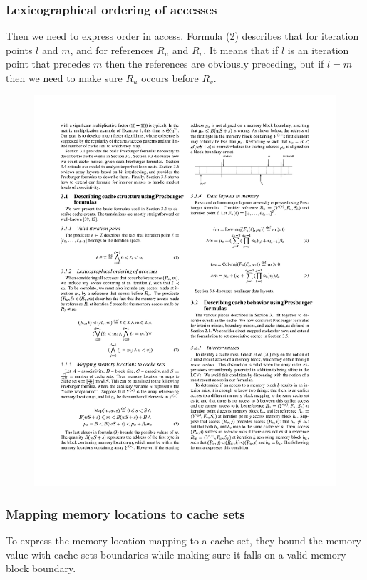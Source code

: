 \documentclass{article}
\begin{document}
\subsubsection{Lexicographical ordering of accesses}
Then we need to express order in access.
Formula (2) describes that for iteration points $l$ and $m$, and for references $R_u$ and $R_v$.
It means that if $l$ is an iteration point that precedes $m$ then the references are obviously preceding, but if $l = m$ then we need to make sure $R_u$ occurs before $R_v$. %
\begin{figure}[H]
        \centering
        \includegraphics[scale=1.1]{eq2}
\label{fig:eq2}
\end{figure}

\subsubsection{Mapping memory locations to cache sets}
To express the memory location mapping to a cache set, they bound the memory value with cache sets boundaries while making sure it falls on a valid memory block boundary.
\end{document}
